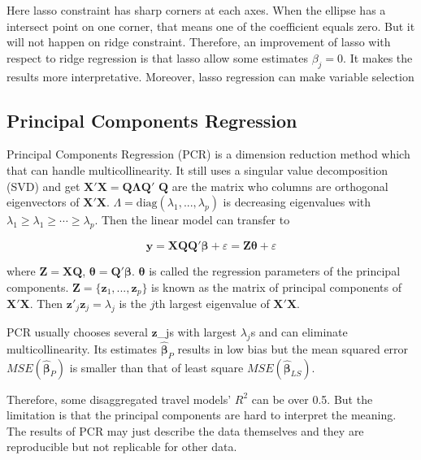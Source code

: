 \documentclass[
  11pt,
  openany]{memoir}
\begin{document}
Here lasso constraint has sharp corners at each axes. When the ellipse has a intersect point on one corner, that means one of the coefficient equals zero. But it will not happen on ridge constraint.
Therefore, an improvement of lasso with respect to ridge regression is that lasso allow some estimates \(\beta_j=0\). It makes the results more interpretative. Moreover, lasso regression can make variable selection

\hypertarget{principal-components-regression}{%
\subsection{Principal Components Regression}\label{principal-components-regression}}

Principal Components Regression (PCR) is a dimension reduction method which that can handle multicollinearity.
It still uses a singular value decomposition (SVD) and get \(\mathbf{X'X}=\mathbf{Q\Lambda Q}'\)
\(\mathbf{Q}\) are the matrix who columns are orthogonal eigenvectors of \(\mathbf{X'X}\). \(\Lambda=\text{diag}(\lambda_1,...,\lambda_p)\) is decreasing eigenvalues with \(\lambda_1\ge\lambda_1\ge\cdots\ge\lambda_p\). Then the linear model can transfer to

\begin{equation}
\mathbf{y} = \mathbf{XQQ}'\boldsymbol\beta + \varepsilon = \mathbf{Z}\boldsymbol\theta + \varepsilon
\end{equation}

where \(\mathbf{Z}=\mathbf{XQ}\), \(\boldsymbol\theta=\mathbf{Q}'\boldsymbol\beta\).
\(\boldsymbol\theta\) is called the regression parameters of the principal components.
\(\mathbf{Z}=\{\mathbf{z}_1,...,\mathbf{z}_p\}\) is known as the matrix of principal components of \(\mathbf{X'X}\).
Then \(\mathbf{z}'_j\mathbf{z}_j=\lambda_j\) is the \(j\)th largest eigenvalue of \(\mathbf{X'X}\).

PCR usually chooses several \(\mathbf{z}\)\_js with largest \(\lambda_j\)s and can eliminate multicollinearity.
Its estimates \(\boldsymbol{\hat\beta}_{P}\) results in low bias but the mean squared error \(MSE(\boldsymbol{\hat\beta}_{P})\) is smaller than that of least square \(MSE(\boldsymbol{\hat\beta}_{LS})\).

Therefore, some disaggregated travel models' \(R^2\) can be over 0.5. But the limitation is that the principal components are hard to interpret the meaning.
The results of PCR may just describe the data themselves and they are reproducible but not replicable for other data.
\end{document}
